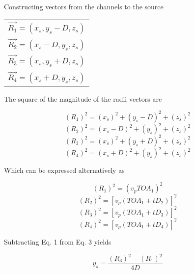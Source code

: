 \documentclass[12pt]{article}
\begin{document}
\noindent Constructing vectors from the channels to the source

\begin{center}
\begin{tabular}{l}
$\overrightarrow{R_1} = (x_s,y_s-D,z_s)$\\
$\overrightarrow{R_2} = (x_s-D,y_s,z_s)$\\
$\overrightarrow{R_3} = (x_s,y_s+D,z_s)$\\
$\overrightarrow{R_4} = (x_s+D,y_s,z_s)$\\
\end{tabular}
\end{center}

\pagebreak
\noindent The square of the magnitude of the radii vectors are

\begin{center}
\begin{equation} \label{eq:1}
(R_1)^2 = (x_s)^2 + (y_s-D)^2 + (z_s)^2
\end{equation}
\begin{equation} \label{eq:2}
(R_2)^2 = (x_s-D)^2 + (y_s)^2 + (z_s)^2
\end{equation}
\begin{equation} \label{eq:3}
(R_3)^2 = (x_s)^2 + (y_s+D)^2 + (z_s)^2
\end{equation}
\begin{equation} \label{eq:4}
(R_4)^2 = (x_s+D)^2 + (y_s)^2 + (z_s)^2
\end{equation}
\end{center}

\vspace{4 mm}
\noindent Which can be expressed alternatively as\\

\begin{center}
\begin{equation} \label{eq:5}
(R_1)^2 = (v_p TOA_1)^2
\end{equation}
\begin{equation} \label{eq:6}
(R_2)^2 = [v_p (TOA_1 + tD_2)]^2
\end{equation}
\begin{equation} \label{eq:7}
(R_3)^2 = [v_p (TOA_1 + tD_3)]^2
\end{equation}
\begin{equation} \label{eq:8}
(R_4)^2 = [v_p (TOA_1 + tD_4)]^2
\end{equation}
\end{center}

\vspace{5 mm}
\noindent Subtracting Eq. 1 from Eq. 3 yields
\begin{center}
\begin{equation} \label{eq:10}
y_s = \frac{(R_3)^2 - (R_1)^2}{4D}
\end{equation}
\end{center}
\end{document}
